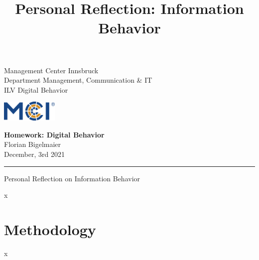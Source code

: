 \documentclass[11pt,letterpaper]{article}
\newcommand{\fontsmall}{\fontsize{7pt}{10pt}\selectfont}
\newcommand{\fontnormal}{\fontsize{11pt}{16pt}\selectfont}
\newcommand{\headline}{\fontsize{17pt}{26pt}\selectfont}
\begin{document}
   \title{Personal Reflection: Information Behavior} 



\noindent\begin{minipage}{0.5\textwidth}
\fontsmall
Management Center Innsbruck \\
Department Management, Communication \& IT  \\
ILV Digital Behavior


\end{minipage}%
\hfill%
\begin{minipage}{0.3\textwidth}\raggedleft
\includegraphics[height=1.0cm]{mci-logo.png}

\end{minipage}


 
\begin{center}
\textbf{Homework: Digital Behavior}\\   %
Florian Bigelmaier\\                         %
December, 3rd 2021\\                         %
\end{center}
\rule{\linewidth}{0.1mm}




\headline \begin{center}
Personal Reflection on Information Behavior
\end{center} 
\fontnormal 
x
\section*{Methodology}
x




\newpage





\printbibliography 
\end{document}
